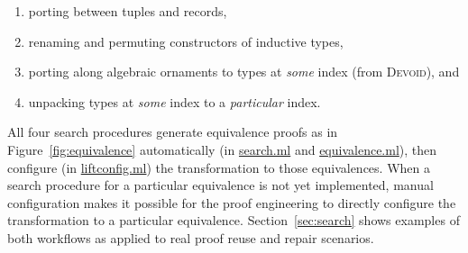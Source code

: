 \begin{enumerate}
\item porting between tuples and records,
\item renaming and permuting constructors of inductive types,
\item porting along algebraic ornaments to types at \textit{some} index (from \textsc{Devoid}), and
\item unpacking types at \textit{some} index to a \textit{particular} index.
\end{enumerate}
All four search procedures generate equivalence proofs as in Figure~\ref{fig:equivalence} automatically (in \href{https://github.com/uwplse/pumpkin-pi/blob/master/plugin/src/automation/search/search.ml}{search.ml} and \href{https://github.com/uwplse/pumpkin-pi/blob/master/plugin/src/automation/search/equivalence.ml}{equivalence.ml}),
then configure (in \href{https://github.com/uwplse/pumpkin-pi/blob/master/plugin/src/automation/lift/liftconfig.ml}{liftconfig.ml}) the transformation to those equivalences.
When a search procedure for a particular equivalence is not yet implemented, manual configuration makes it possible
for the proof engineering to directly configure the transformation to a particular equivalence.
Section~\ref{sec:search} shows examples of both workflows as applied to real proof reuse and repair scenarios.




